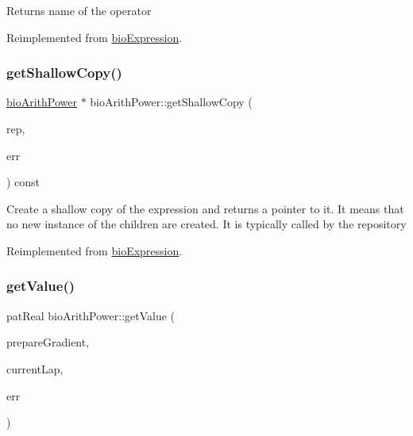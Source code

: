 \begin{DoxyReturn}{Returns}
name of the operator 
\end{DoxyReturn}


Reimplemented from \hyperlink{classbio_expression_a2353a4afb3a2b0af7c63aba086a72bde}{bio\+Expression}.

\mbox{\label{classbio_arith_power_a1a95ae563759a44ffb29b42c82209f90}} 
\subsubsection{\texorpdfstring{get\+Shallow\+Copy()}{getShallowCopy()}}
{\footnotesize\ttfamily \hyperlink{classbio_arith_power}{bio\+Arith\+Power} $\ast$ bio\+Arith\+Power\+::get\+Shallow\+Copy (\begin{DoxyParamCaption}\item[{\hyperlink{classbio_expression_repository}{bio\+Expression\+Repository} $\ast$}]{rep,  }\item[{pat\+Error $\ast$\&}]{err }\end{DoxyParamCaption}) const\hspace{0.3cm}{\ttfamily [virtual]}}

Create a shallow copy of the expression and returns a pointer to it. It means that no new instance of the children are created. It is typically called by the repository 

Reimplemented from \hyperlink{classbio_expression_a442534762693b92baaf33928979a1bf8}{bio\+Expression}.

\mbox{\label{classbio_arith_power_a3274071fcc8f58adb67b82880e178842}} 
\subsubsection{\texorpdfstring{get\+Value()}{getValue()}}
{\footnotesize\ttfamily pat\+Real bio\+Arith\+Power\+::get\+Value (\begin{DoxyParamCaption}\item[{pat\+Boolean}]{prepare\+Gradient,  }\item[{pat\+U\+Long}]{current\+Lap,  }\item[{pat\+Error $\ast$\&}]{err }\end{DoxyParamCaption})\hspace{0.3cm}{\ttfamily [virtual]}}

